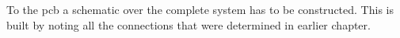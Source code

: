 To the \gls{pcb} a schematic over the complete system has to be constructed. This is built by noting all the connections that were determined in earlier chapter.